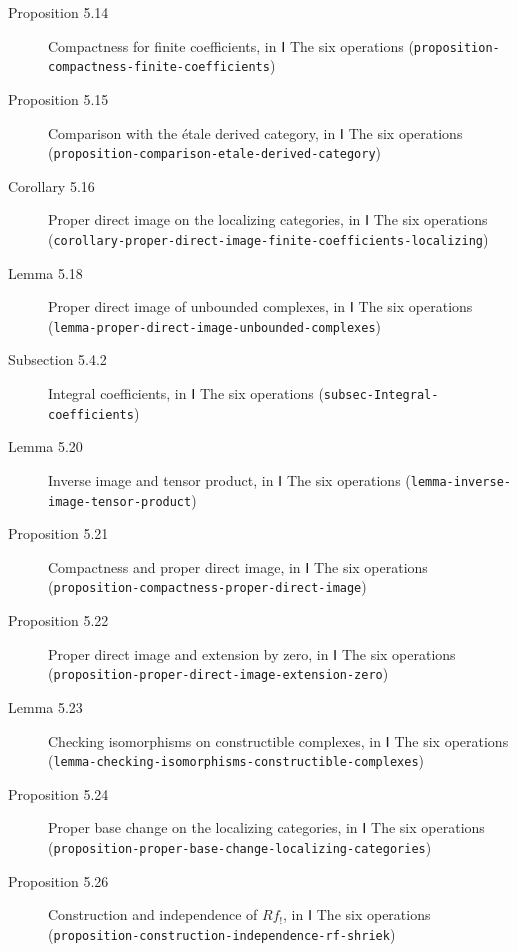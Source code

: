 \documentclass[11pt]{article}
\newcommand{\bpslug}[1]{\texttt{#1}}
\begin{document}
\begin{description}
\item[Proposition 5.14] Compactness for finite coefficients, in Ⅰ The six operations (\bpslug{proposition-{}\allowbreak{}compactness-{}\allowbreak{}finite-{}\allowbreak{}coefficients})
\item[Proposition 5.15] Comparison with the étale derived category, in Ⅰ The six operations (\bpslug{proposition-{}\allowbreak{}comparison-{}\allowbreak{}etale-{}\allowbreak{}derived-{}\allowbreak{}category})
\item[Corollary 5.16] Proper direct image on the localizing categories, in Ⅰ The six operations (\bpslug{corollary-{}\allowbreak{}proper-{}\allowbreak{}direct-{}\allowbreak{}image-{}\allowbreak{}finite-{}\allowbreak{}coefficients-{}\allowbreak{}localizing})
\item[Lemma 5.18] Proper direct image of unbounded complexes, in Ⅰ The six operations (\bpslug{lemma-{}\allowbreak{}proper-{}\allowbreak{}direct-{}\allowbreak{}image-{}\allowbreak{}unbounded-{}\allowbreak{}complexes})
\item[Subsection 5.4.2] Integral coefficients, in Ⅰ The six operations (\bpslug{subsec-{}\allowbreak{}Integral-{}\allowbreak{}coefficients})
\item[Lemma 5.20] Inverse image and tensor product, in Ⅰ The six operations (\bpslug{lemma-{}\allowbreak{}inverse-{}\allowbreak{}image-{}\allowbreak{}tensor-{}\allowbreak{}product})
\item[Proposition 5.21] Compactness and proper direct image, in Ⅰ The six operations (\bpslug{proposition-{}\allowbreak{}compactness-{}\allowbreak{}proper-{}\allowbreak{}direct-{}\allowbreak{}image})
\item[Proposition 5.22] Proper direct image and extension by zero, in Ⅰ The six operations (\bpslug{proposition-{}\allowbreak{}proper-{}\allowbreak{}direct-{}\allowbreak{}image-{}\allowbreak{}extension-{}\allowbreak{}zero})
\item[Lemma 5.23] Checking isomorphisms on constructible complexes, in Ⅰ The six operations (\bpslug{lemma-{}\allowbreak{}checking-{}\allowbreak{}isomorphisms-{}\allowbreak{}constructible-{}\allowbreak{}complexes})
\item[Proposition 5.24] Proper base change on the localizing categories, in Ⅰ The six operations (\bpslug{proposition-{}\allowbreak{}proper-{}\allowbreak{}base-{}\allowbreak{}change-{}\allowbreak{}localizing-{}\allowbreak{}categories})
\item[Proposition 5.26] Construction and independence of $Rf_!$, in Ⅰ The six operations (\bpslug{proposition-{}\allowbreak{}construction-{}\allowbreak{}independence-{}\allowbreak{}rf-{}\allowbreak{}shriek})

\end{description}
\end{document}

